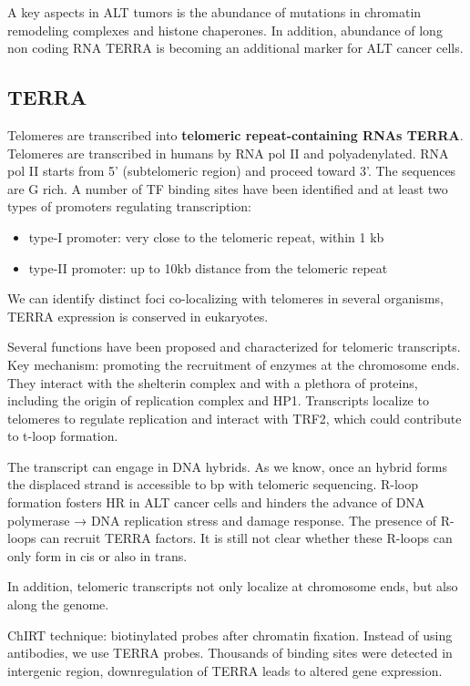 A key aspects in ALT tumors is the abundance of mutations in chromatin
remodeling complexes and histone chaperones. In addition, abundance of
long non coding RNA TERRA is becoming an additional marker for ALT
cancer cells.

\hypertarget{terra}{%
\subsection{TERRA}\label{terra}}

Telomeres are transcribed into \textbf{telomeric repeat-containing RNAs
TERRA}. Telomeres are transcribed in humans by RNA pol II and
polyadenylated. RNA pol II starts from 5' (subtelomeric region) and
proceed toward 3'. The sequences are G rich. A number of TF binding
sites have been identified and at least two types of promoters
regulating transcription:

\begin{itemize}
\tightlist
\item
  type-I promoter: very close to the telomeric repeat, within 1 kb
\item
  type-II promoter: up to 10kb distance from the telomeric repeat
\end{itemize}

We can identify distinct foci co-localizing with telomeres in several
organisms, TERRA expression is conserved in eukaryotes.

Several functions have been proposed and characterized for telomeric
transcripts. Key mechanism: promoting the recruitment of enzymes at the
chromosome ends. They interact with the shelterin complex and with a
plethora of proteins, including the origin of replication complex and
HP1. Transcripts localize to telomeres to regulate replication and
interact with TRF2, which could contribute to t-loop formation.

The transcript can engage in DNA hybrids. As we know, once an hybrid
forms the displaced strand is accessible to bp with telomeric
sequencing. R-loop formation fosters HR in ALT cancer cells and hinders
the advance of DNA polymerase → DNA replication stress and damage
response. The presence of R-loops can recruit TERRA factors. It is still
not clear whether these R-loops can only form in cis or also in trans.

In addition, telomeric transcripts not only localize at chromosome ends,
but also along the genome.

ChIRT technique: biotinylated probes after chromatin fixation. Instead
of using antibodies, we use TERRA probes. Thousands of binding sites
were detected in intergenic region, downregulation of TERRA leads to
altered gene expression.

